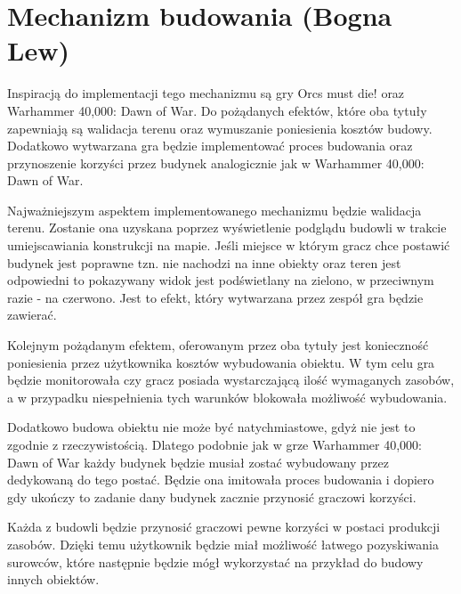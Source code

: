 \section{Mechanizm budowania (Bogna Lew)}\label{chap:build}
Inspiracją do implementacji tego mechanizmu są gry Orcs must die! oraz Warhammer 40,000: Dawn of War. Do pożądanych
efektów, które oba tytuły zapewniają są walidacja terenu oraz wymuszanie poniesienia kosztów budowy. Dodatkowo
wytwarzana gra będzie implementować proces budowania oraz przynoszenie korzyści przez budynek analogicznie jak w
Warhammer 40,000: Dawn of War.

Najważniejszym aspektem implementowanego mechanizmu będzie walidacja terenu. Zostanie ona uzyskana poprzez wyświetlenie
podglądu budowli w trakcie umiejscawiania konstrukcji na mapie. Jeśli miejsce w którym gracz chce postawić budynek jest
poprawne tzn. nie nachodzi na inne obiekty oraz teren jest odpowiedni to pokazywany widok jest podświetlany na zielono,
w przeciwnym razie - na czerwono. Jest to efekt, który wytwarzana przez zespół gra będzie zawierać.

Kolejnym pożądanym efektem, oferowanym przez oba tytuły jest konieczność poniesienia przez użytkownika kosztów
wybudowania obiektu. W tym celu gra będzie monitorowała czy gracz posiada wystarczającą ilość wymaganych zasobów, a w
przypadku niespełnienia tych warunków blokowała możliwość wybudowania.

Dodatkowo budowa obiektu nie może być natychmiastowe, gdyż nie jest to zgodnie z rzeczywistością. Dlatego podobnie jak w
grze Warhammer 40,000: Dawn of War każdy budynek będzie musiał zostać wybudowany przez dedykowaną do tego postać. Będzie
ona imitowała proces budowania i dopiero gdy ukończy to zadanie dany budynek zacznie przynosić graczowi korzyści.

Każda z budowli będzie przynosić graczowi pewne korzyści w postaci produkcji zasobów. Dzięki temu użytkownik będzie miał
możliwość łatwego pozyskiwania surowców, które następnie będzie mógł wykorzystać na przykład do budowy innych obiektów.
